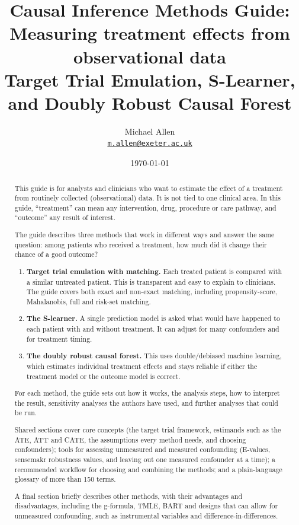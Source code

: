 \documentclass[11pt,a4paper]{article}
\title{Causal Inference Methods Guide:\\[2pt]
\large Measuring treatment effects from observational data\\[4pt]
\normalsize Target Trial Emulation, S-Learner, and Doubly Robust Causal Forest}
\author{Michael Allen\\ \href{mailto:m.allen@exeter.ac.uk}{\texttt{m.allen@exeter.ac.uk}}}
\date{\today}
\begin{document}
\maketitle
\begin{abstract}
\setlength{\parindent}{0pt}\setlength{\parskip}{6pt plus 2pt}%
\noindent This guide is for analysts and clinicians who want to estimate the effect of a treatment from routinely collected (observational) data. It is not tied to one clinical area. In this guide, ``treatment'' can mean any intervention, drug, procedure or care pathway, and ``outcome'' any result of interest.

The guide describes three methods that work in different ways and answer the same question: among patients who received a treatment, how much did it change their chance of a good outcome?
\begin{enumerate}
\item \textbf{Target trial emulation with matching.} Each treated patient is compared with a similar untreated patient. This is transparent and easy to explain to clinicians. The guide covers both exact and non-exact matching, including propensity-score, Mahalanobis, full and risk-set matching.
\item \textbf{The S-learner.} A single prediction model is asked what would have happened to each patient with and without treatment. It can adjust for many confounders and for treatment timing.
\item \textbf{The doubly robust causal forest.} This uses double/debiased machine learning, which estimates individual treatment effects and stays reliable if either the treatment model or the outcome model is correct.
\end{enumerate}
For each method, the guide sets out how it works, the analysis steps, how to interpret the result, sensitivity analyses the authors have used, and further analyses that could be run.

Shared sections cover core concepts (the target trial framework, estimands such as the ATE, ATT and CATE, the assumptions every method needs, and choosing confounders); tools for assessing unmeasured and measured confounding (E-values, sensemakr robustness values, and leaving out one measured confounder at a time); a recommended workflow for choosing and combining the methods; and a plain-language glossary of more than 150 terms.

A final section briefly describes other methods, with their advantages and disadvantages, including the g-formula, TMLE, BART and designs that can allow for unmeasured confounding, such as instrumental variables and difference-in-differences.


\end{abstract}
\end{document}
